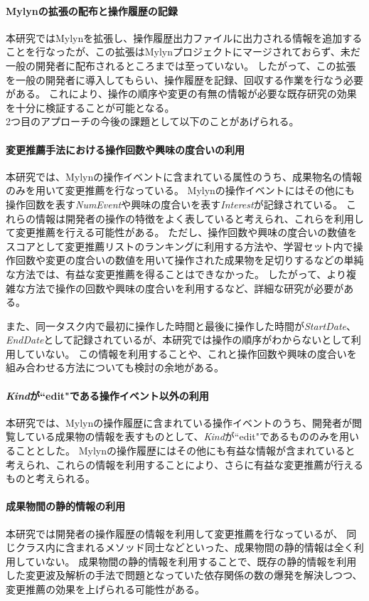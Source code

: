 \documentclass[a4paper]{jsbook}
\begin{document}
\paragraph{Mylynの拡張の配布と操作履歴の記録}
本研究ではMylynを拡張し、操作履歴出力ファイルに出力される情報を追加することを行なったが、この拡張はMylynプロジェクトにマージされておらず、未だ一般の開発者に配布されるところまでは至っていない。
したがって、この拡張を一般の開発者に導入してもらい、操作履歴を記録、回収する作業を行なう必要がある。
これにより、操作の順序や変更の有無の情報が必要な既存研究の効果を十分に検証することが可能となる。
\\

2つ目のアプローチの今後の課題として以下のことがあげられる。
\paragraph{変更推薦手法における操作回数や興味の度合いの利用}
本研究では、Mylynの操作イベントに含まれている属性のうち、成果物名の情報のみを用いて変更推薦を行なっている。
Mylynの操作イベントにはその他にも操作回数を表す{\it NumEvent}や興味の度合いを表す{\it Interest}が記録されている。
これらの情報は開発者の操作の特徴をよく表していると考えられ、これらを利用して変更推薦を行える可能性がある。
ただし、操作回数や興味の度合いの数値をスコアとして変更推薦リストのランキングに利用する方法や、学習セット内で操作回数や変更の度合いの数値を用いて操作された成果物を足切りするなどの単純な方法では、有益な変更推薦を得ることはできなかった。
したがって、より複雑な方法で操作の回数や興味の度合いを利用するなど、詳細な研究が必要がある。

また、同一タスク内で最初に操作した時間と最後に操作した時間が{\it StartDate}、{\it EndDate}として記録されているが、本研究では操作の順序がわからないとして利用していない。
この情報を利用することや、これと操作回数や興味の度合いを組み合わせる方法についても検討の余地がある。
\paragraph{{\it Kind}が``edit"である操作イベント以外の利用}
本研究では、Mylynの操作履歴に含まれている操作イベントのうち、開発者が閲覧している成果物の情報を表すものとして、{\it Kind}が``edit"であるもののみを用いることとした。
Mylynの操作履歴にはその他にも有益な情報が含まれていると考えられ、これらの情報を利用することにより、さらに有益な変更推薦が行えるものと考えられる。
\paragraph{成果物間の静的情報の利用}
本研究では開発者の操作履歴の情報を利用して変更推薦を行なっているが、
同じクラス内に含まれるメソッド同士などといった、成果物間の静的情報は全く利用していない。
成果物間の静的情報を利用することで、既存の静的情報を利用した変更波及解析の手法で問題となっていた依存関係の数の爆発を解決しつつ、変更推薦の効果を上げられる可能性がある。
\end{document}
